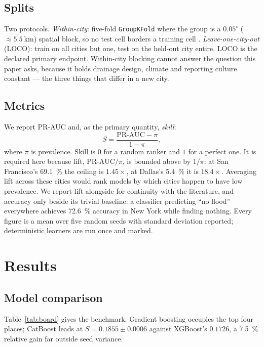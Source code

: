 \documentclass[11pt]{article}
\newcommand{\skl}{\ensuremath{S}}
\begin{document}
\subsection{Splits}
Two protocols. \emph{Within-city}: five-fold \texttt{GroupKFold} where the group
is a $0.05^\circ$ ($\approx\SI{5.5}{\kilo\metre}$) spatial block, so no test cell
borders a training cell \citep{roberts2017,ploton2020}. \emph{Leave-one-city-out}
(LOCO): train on all cities but one, test on the held-out city entire. LOCO is
the declared primary endpoint. Within-city blocking cannot answer the question
this paper asks, because it holds drainage design, climate and reporting culture
constant --- the three things that differ in a new city.

\subsection{Metrics}\label{sec:metrics}
We report PR-AUC and, as the primary quantity, \emph{skill}:
\begin{equation}
  \skl = \frac{\mathrm{PR\text{-}AUC} - \pi}{1 - \pi},
  \label{eq:skill}
\end{equation}
where $\pi$ is prevalence. Skill is $0$ for a random ranker and $1$ for a perfect
one. It is required here because lift, $\mathrm{PR\text{-}AUC}/\pi$, is bounded
above by $1/\pi$: at San Francisco's \SI{69.1}{\percent} the ceiling is
$1.45\times$, at Dallas's \SI{5.4}{\percent} it is $18.4\times$. Averaging lift
across these cities would rank models by which cities happen to have low
prevalence. We report lift alongside for continuity with the literature, and
accuracy only beside its trivial baseline: a classifier predicting ``no flood''
everywhere achieves \SI{72.6}{\percent} accuracy in New York while finding
nothing. Every figure is a mean over five random seeds with standard deviation
reported; deterministic learners are run once and marked.

\section{Results}\label{sec:results}

\subsection{Model comparison}
Table~\ref{tab:board} gives the benchmark. Gradient boosting occupies the top
four places; CatBoost leads at $\skl = 0.1855 \pm 0.0006$ against XGBoost's
$0.1726$, a \SI{7.5}{\percent} relative gain far outside seed variance.
\end{document}
